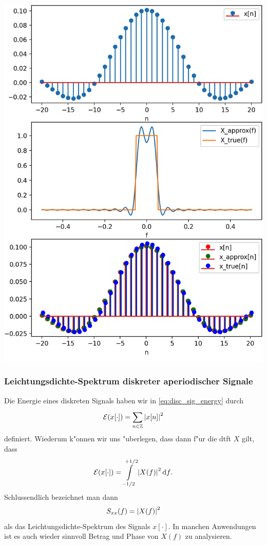 \begin{listing}[ht]
    \noindent
    \begin{minipage}{0.51\textwidth}
        \strut\vspace*{-\baselineskip}\newline
        \inputminted[firstline=5, lastline=48]{python3}{code/dtft.py}
    \end{minipage}%
    \begin{minipage}{0.48\textwidth}
        \strut\vspace*{-\baselineskip}\newline
        \includegraphics[width=\textwidth]{code/dtft.png}
    \end{minipage}
    \label{py:dtft}
\end{listing}
%
\FloatBarrier
\subsubsection{Leichtungsdichte-Spektrum diskreter aperiodischer Signale}\label{sec:fourier:disc_aperiod_power}
%
Die Energie eines diskreten Signals haben wir in \eqref{eq:disc_sig_energy} durch
\[
\mathcal{E}(x[\cdot]) = {\sum\limits_{n \in \mathbb{Z}}^{}{{\left| x[n] \right|}^2}} 
\]
definiert.
Wiederum k"onnen wir uns "uberlegen, dass dann f"ur die \gls{dtft} $X$ gilt, dass
\[
\mathcal{E}(x[\cdot]) = {\int\limits_{-1/2}^{+1/2}{{\left| X(f) \right|}^2}\,\mathrm{d}{f}}.
\]
Schlussendlich bezeichnet man dann
\[
S_{xx}(f) = {\left| X(f) \right|}^2
\]
als das Leichtungsdichte-Spektrum des Signals $x[\cdot]$.
In manchen Anwendungen ist es auch wieder sinnvoll Betrag und Phase von $X(f)$ zu analysieren.
%
